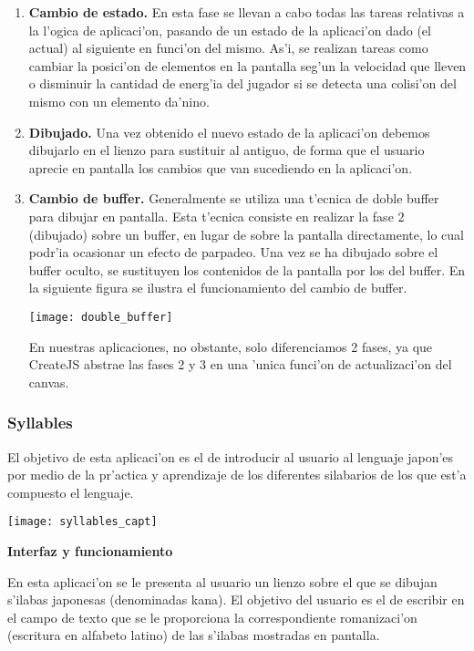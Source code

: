 \begin{itemize}
\begin{enumerate}
\item \textbf{Cambio de estado.} En esta fase se llevan a cabo todas las tareas relativas a la l'ogica de aplicaci'on,
pasando de un estado de la aplicaci'on dado (el actual) al siguiente en funci'on del mismo. As'i, se realizan tareas
como cambiar la posici'on de elementos en la pantalla seg'un la velocidad que lleven o disminuir la cantidad de 
energ'ia del jugador si se detecta una colisi'on del mismo con un elemento da'nino.
\item \textbf{Dibujado.} Una vez obtenido el nuevo estado de la aplicaci'on debemos dibujarlo en el lienzo para sustituir
al antiguo, de forma que el usuario aprecie en pantalla los cambios que van sucediendo en la aplicaci'on.
\item \textbf{Cambio de buffer.} Generalmente se utiliza una t'ecnica de doble buffer para dibujar en pantalla. Esta
t'ecnica consiste en realizar la fase 2 (dibujado) sobre un buffer, en lugar de sobre la pantalla directamente, lo 
cual podr'ia ocasionar un efecto de parpadeo. Una vez se ha dibujado sobre el buffer oculto, se sustituyen los 
contenidos de la pantalla por los del buffer.
En la siguiente figura se ilustra el funcionamiento del cambio de buffer.


\centerline{\texttt{[image: double\_buffer]}}

En nuestras aplicaciones, no obstante, solo diferenciamos 2 fases, ya que CreateJS abstrae las fases 2 y 3 en una
'unica funci'on de actualizaci'on del canvas.
\end{enumerate}
\end{itemize}

\subsubsection{Syllables}
\label{sub:syllables}

El objetivo de esta aplicaci'on es el de introducir al usuario al lenguaje japon'es por medio de la pr'actica y
aprendizaje de los diferentes silabarios de los que est'a compuesto el lenguaje.

\begin{center}
\texttt{[image: syllables\_capt]}
\end{center}

\textbf{Interfaz y funcionamiento}

En esta aplicaci'on se le presenta al usuario un lienzo sobre el que se dibujan s'ilabas japonesas (denominadas kana).
El objetivo del usuario es el de escribir en el campo de texto que se le proporciona la correspondiente romanizaci'on
(escritura en alfabeto latino) de las s'ilabas mostradas en pantalla.


